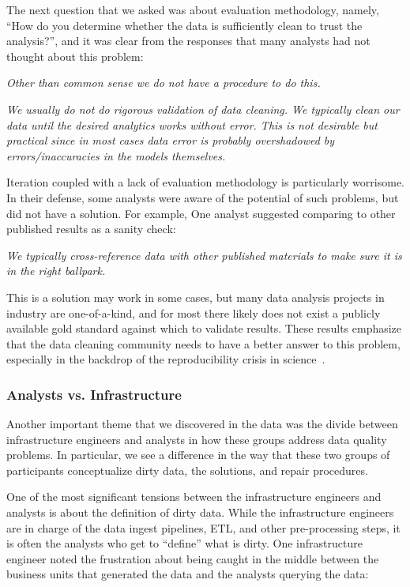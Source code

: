 The next question that we asked was about evaluation methodology, namely, ``How do you determine whether the data is sufficiently clean to trust the analysis?'', and it was clear from the responses that many analysts had not thought about this problem:

\vspace{0.5em}
\emph{Other than common sense we do not have a procedure to do this.}

\vspace{0.7em}
\emph{We usually do not do rigorous validation of data cleaning. We typically clean our data until the desired analytics works without error. This is not desirable but practical since in most cases data error is probably overshadowed by errors/inaccuracies in the models themselves.}

\vspace{0.5em}

Iteration coupled with a lack of evaluation methodology is particularly worrisome.
In their defense, some analysts were aware of the potential of such problems, but did not have a solution.
For example, One analyst suggested comparing to other published results as a sanity check:

\vspace{0.5em}
\emph{We typically cross-reference data with other published materials to make sure it is in the right ballpark.}
\vspace{0.5em}

This is a solution may work in some cases, but many data analysis projects in industry are one-of-a-kind, and for most there likely does not exist a publicly available gold standard against which to validate results.
These results emphasize that the data cleaning community needs to have a better answer to this problem, especially in the backdrop of the reproducibility crisis in science~\cite{reproducibility}.

\subsubsection{Analysts vs. Infrastructure}
Another important theme that we discovered in the data was the divide between infrastructure engineers and analysts in how these groups address data quality problems. In particular, we see a difference in the way that these two groups of participants conceptualize dirty data, the solutions, and repair procedures.

One of the most significant tensions between the infrastructure engineers and analysts is about the definition of dirty data. While the infrastructure engineers are in charge of the data ingest pipelines, ETL, and other pre-processing steps, it is often the analysts who get to ``define'' what is dirty. One infrastructure engineer noted the frustration about being caught in the middle between the business units that generated the data and the analysts querying the data:

